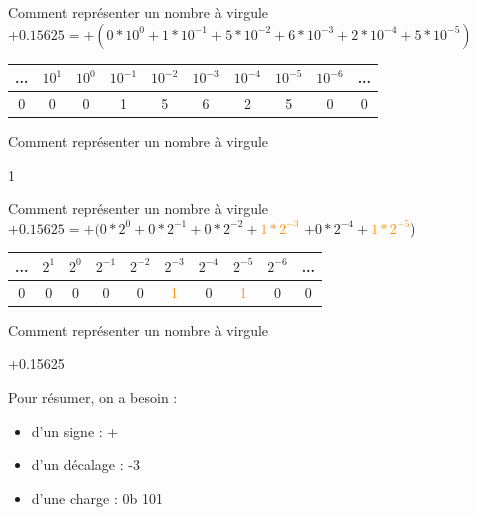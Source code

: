 \documentclass{beamer}
\begin{document}
  \begin{frame}{Comment représenter un nombre à virgule} 
    $+0.15625 = +(0*10^{0} + 1*10^{-1} + 5*10^{-2} + 6*10^{-3} + 2*10^{-4} + 5*10^{-5})$
    \begin{center}
      \begin{tabular}{|c|c|c|c|c|c|c|c|c|c|} \hline
        ... & $10^{1}$ & $10^{0}$ & $10^{-1}$ & $10^{-2}$ & $10^{-3}$ & $10^{-4}$ & $10^{-5}$ & $10^{-6}$ & ... \\ \hline
        0 & 0 & 0 & 1 & 5 & 6 & 2 & 5 & 0 & 0\\ \hline
      \end{tabular}
    \end{center}
  \end{frame}
  
  \begin{frame}{Comment représenter un nombre à virgule} 
    \begin{center}
\fontsize{100}{110} \hspace{1cm} 1
    \end{center}
  \end{frame}
  
  \begin{frame}{Comment représenter un nombre à virgule} 
    $+0.15625 = +(0*2^{0} + 0*2^{-1} + 0*2^{-2} + $\textcolor{DarkOrange}{$1*2^{-3}$} $+ 0*2^{-4} + $\textcolor{DarkOrange}{$1*2^{-5}$})
    \begin{center}
      \begin{tabular}{|c|c|c|c|c||c|c|c|c|c|} \hline
        ... & $2^{1}$ & $2^{0}$ & $2^{-1}$ & $2^{-2}$ & $2^{-3}$ & $2^{-4}$ & $2^{-5}$ & $2^{-6}$ & ... \\ \hline
        0 & 0 & 0 & 0 & 0 & \textcolor{DarkOrange}{1} & 0 & \textcolor{DarkOrange}{1} & 0 & 0 \\ \hline
      \end{tabular}
    \end{center}
  \end{frame}
  
  \begin{frame}{Comment représenter un nombre à virgule} 
    \begin{Huge}
    \begin{center}
    +0.15625
    \end{center}
    \end{Huge}
Pour résumer, on a besoin : 
    \begin{itemize}
      \item d'un signe : + 
      \item d'un décalage : -3 
      \item d'une charge : 0b 101
    \end{itemize}
  \end{frame}
 
\end{document}

